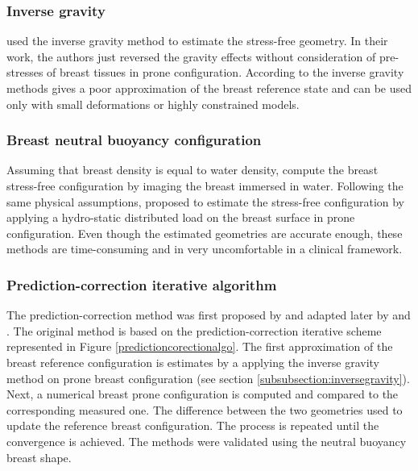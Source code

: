   \subsubsection*{Inverse gravity}\label{subsubsection:inversegravity}
 \citep{palomar_finite_2008, sturgeon_finite_element_2016} used the inverse gravity method to estimate the stress-free geometry. In their work, the authors just reversed the gravity effects without consideration of pre-stresses of breast tissues in prone configuration. According to \cite{eiben_breast_2014} the inverse gravity methods gives a poor approximation of the breast reference state and can be used only with small deformations or highly constrained models.  

 \subsubsection*{Breast neutral buoyancy configuration}
 Assuming that breast density is equal to water density, \cite{rajagopal_creating_2008} compute the breast stress-free configuration by imaging the breast immersed in water. Following the same physical assumptions, \cite{kuhlmann_mechanical_2013} proposed to estimate the stress-free configuration by applying a hydro-static distributed load on the breast surface in prone configuration. Even though the estimated geometries are accurate enough, these methods are time-consuming and in very uncomfortable in a clinical framework. 

 \subsubsection*{Prediction-correction iterative algorithm}
 The prediction-correction method was first proposed by \citep{govindjee_computational_1998} and adapted later by \cite{carter_biomechanical_2009} and \cite{eiben_breast_2014}. The original method is based on the prediction-correction iterative scheme represented in Figure \ref{predictioncorectionalgo}. The first approximation of the breast reference configuration is estimates by a applying the inverse gravity method on prone breast configuration (see section \ref{subsubsection:inversegravity}).  Next, a numerical breast prone configuration is computed and compared to the corresponding measured one. The difference between the two geometries used to update the reference breast configuration. The process is repeated until the convergence is achieved. The methods were validated using the neutral buoyancy breast shape.


